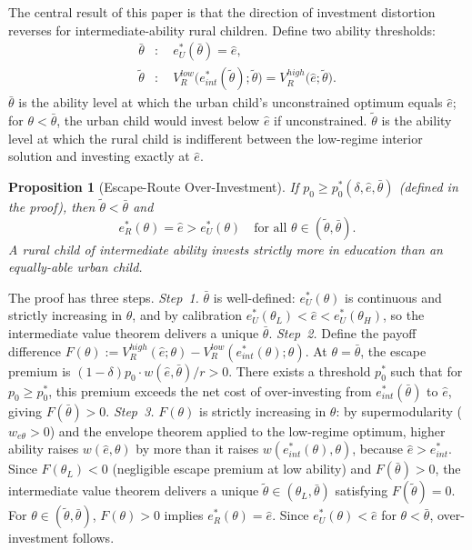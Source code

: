 \documentclass[12pt]{article}
\theoremstyle{plain}
\newtheorem{proposition}{Proposition}
\theoremstyle{definition}
\theoremstyle{remark}
\begin{document}
The central result of this paper is that the direction of investment distortion
reverses for intermediate-ability rural children.  Define two ability thresholds:
\begin{align}
  \bar{\theta}&: \quad e^{*}_{U}(\bar{\theta})=\hat{e},
    \label{eq:thetabar}\\
  \tilde{\theta}&: \quad
    V_{R}^{low}\!\bigl(e^{*}_{int}(\tilde{\theta});\tilde{\theta}\bigr)=
    V_{R}^{high}\!\bigl(\hat{e};\tilde{\theta}\bigr).
    \label{eq:thetatilde}
\end{align}
$\bar{\theta}$ is the ability level at which the urban child's unconstrained
optimum equals $\hat{e}$; for $\theta<\bar{\theta}$, the urban child would invest
below $\hat{e}$ if unconstrained.  $\tilde{\theta}$ is the ability level at which
the rural child is indifferent between the low-regime interior solution and
investing exactly at $\hat{e}$.

\begin{proposition}[Escape-Route Over-Investment]
\label{prop:over}
If $p_{0}\geq p^{*}_{0}(\delta,\hat{e},\bar{\theta})$ (defined in the proof),
then $\tilde{\theta}<\bar{\theta}$ and
\[
  e^{*}_{R}(\theta)=\hat{e}>e^{*}_{U}(\theta)
  \quad\text{for all }\theta\in(\tilde{\theta},\bar{\theta}).
\]
A rural child of intermediate ability invests strictly more in education than an
equally-able urban child.
\end{proposition}

The proof has three steps.  \textit{Step~1.}  $\bar{\theta}$ is well-defined:
$e^{*}_{U}(\theta)$ is continuous and strictly increasing in $\theta$, and by
calibration $e^{*}_{U}(\theta_{L})<\hat{e}<e^{*}_{U}(\theta_{H})$, so the
intermediate value theorem delivers a unique $\bar{\theta}$.  \textit{Step~2.}
Define the payoff difference
$F(\theta):=V_{R}^{high}(\hat{e};\theta)-V_{R}^{low}(e^{*}_{int}(\theta);\theta)$.
At $\theta=\bar{\theta}$, the escape premium is
$(1-\delta)p_{0}\cdot w(\hat{e},\bar{\theta})/r>0$.  There exists a threshold
$p^{*}_{0}$ such that for $p_{0}\geq p^{*}_{0}$, this premium exceeds the net
cost of over-investing from $e^{*}_{int}(\bar{\theta})$ to $\hat{e}$, giving
$F(\bar{\theta})>0$.  \textit{Step~3.}  $F(\theta)$ is strictly increasing in
$\theta$: by supermodularity ($w_{e\theta}>0$) and the envelope theorem applied
to the low-regime optimum, higher ability raises $w(\hat{e},\theta)$ by more than
it raises $w(e^{*}_{int}(\theta),\theta)$, because $\hat{e}>e^{*}_{int}$.  Since
$F(\theta_{L})<0$ (negligible escape premium at low ability) and
$F(\bar{\theta})>0$, the intermediate value theorem delivers a unique
$\tilde{\theta}\in(\theta_{L},\bar{\theta})$ satisfying $F(\tilde{\theta})=0$.
For $\theta\in(\tilde{\theta},\bar{\theta})$, $F(\theta)>0$ implies
$e^{*}_{R}(\theta)=\hat{e}$.  Since $e^{*}_{U}(\theta)<\hat{e}$ for
$\theta<\bar{\theta}$, over-investment follows.
\end{document}
